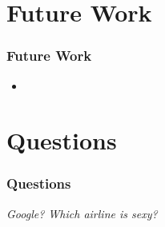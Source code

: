 \documentclass{beamer}
\begin{document}
\section{Future Work}
\begin{frame}
\frametitle{Future Work}
\begin{itemize}
\item 
\end{itemize}

\end{frame}

\section{Questions}
\begin{frame}
\frametitle{Questions}
\begin{center}
\emph{Google? Which airline is sexy?}
\end{center}



\end{frame}

 
\end{document}

